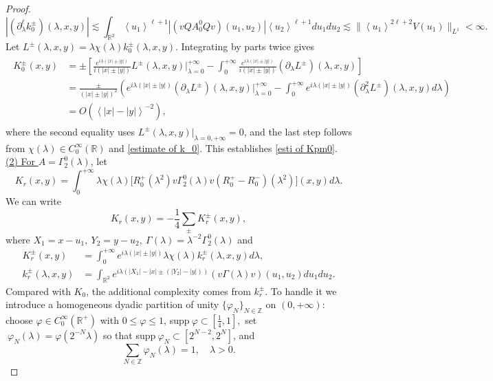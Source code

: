 \documentclass[reqno]{amsart}
\newcommand\R{\mathbb{R}}
\newcommand\Z{\mathbb{Z}}
\numberwithin{equation}{section}
\begin{document}
\begin{proof}
\begin{equation}\label{estimate of k_0}
|(\partial^{\ell}_{\lambda}k^{\pm}_0)(\lambda,x,y)|\lesssim
\int_{\R^2}^{}\left<u_1\right>^{\ell+1}|(vQA^0_0Qv)(u_1,u_2)|\left<u_2\right>^{\ell+1}du_1du_2\lesssim \|\left<u_1\right>^{2\ell+2}V(u_1)\|_{L^1} <\infty.
\end{equation} 
Let $L^{\pm}(\lambda,x,y)=\lambda \chi(\lambda)k^{\pm}_0(\lambda,x,y)$. Integrating by parts twice gives
\begin{align}\label{inte parts twice of Kpm0}
\begin{split}
K^{\pm}_{0}(x,y)&=\pm\left[\frac{e^{i\lambda(|x|\pm |y|)}}{i(|x|\pm |y|)}L^{\pm}(\lambda,x,y)\Big|^{+\infty}_{\lambda=0}-\int_{0}^{+\infty}\frac{e^{i\lambda(|x|\pm |y|)}}{i(|x|\pm |y|)}(\partial_{\lambda}L^{\pm})(\lambda,x,y)\right]\\
&=\frac{\pm}{(|x|\pm |y|)^2}\left(e^{i\lambda(|x|\pm |y|)}(\partial_{\lambda}L^{\pm})(\lambda,x,y)\Big|^{+\infty}_{\lambda=0}-\int_{0}^{+\infty}e^{i\lambda(|x|\pm |y|)}(\partial^2_{\lambda}L^{\pm})(\lambda,x,y
)d\lambda\right)\\
&=O(\left<|x|-|y|\right>^{-2}),
\end{split}
\end{align}
where the second equality uses $L^{\pm}(\lambda,x,y)\big|_{\lambda=0,+\infty}=0$, and the last step follows from $\chi(\lambda)\in C^{\infty}_0(\R)$ and \eqref{estimate of k_0}.
This establishes \eqref{esti of Kpm0}.
\vskip0.3cm
\underline{(2) For $A=\Gamma^0_2(\lambda)$}, let 
\begin{equation*}
K_r(x,y)=\int_{0}^{+\infty}\lambda\chi(\lambda)\big[R^+_0(\lambda^{2})v\Gamma^0_2(\lambda)v(R^+_0-R^-_0)(\lambda^{2})\big](x,y)d\lambda.
\end{equation*}
We can write
\begin{equation*}
    K_r(x,y)=-\frac{1}{4}\sum\limits_{\pm}K^{\pm}_r(x,y),
\end{equation*}
where $X_1=x-u_1,\ Y_2=y-u_2,\ {\Gamma}(\lambda)=\lambda^{-2}\Gamma^0_2(\lambda)$ and 
\begin{align*}
K^{\pm}_r(x,y)&=\int_{0}^{+\infty}e^{i\lambda(|x|\pm|y|)}\lambda\chi(\lambda)k^{\pm}_r(\lambda,x,y)d\lambda,\\
k^{\pm}_r(\lambda,x,y)&=\int_{\R^2}e^{i\lambda(|X_1|-|x|\pm (|Y_2|-|y|))}(v\Gamma(\lambda)v)(u_1,u_2)du_1du_2.
\end{align*}
\indent Compared with $K_0$, the additional complexity comes from $k^{\pm}_r$. To handle it we introduce a homogeneous dyadic partition of unity $\{{\varphi_{N}}\}_{N\in \Z}$ on $(0,+\infty)$: choose $\varphi\in C^{\infty}_{0}(\R^{+})$ with $0\leq\varphi\leq1$, supp$~\varphi\subset[\frac{1}{4},1],$ set $\ \varphi_{N}(\lambda)=\varphi(2^{-N}\lambda)$ so that supp$~\varphi_{N}\subset[2^{N-2},2^{N}]$, and $$ \sum_{N\in\Z}{}\varphi_{N}(\lambda)=1,  \quad\lambda>0.$$

\end{proof}
\end{document}
